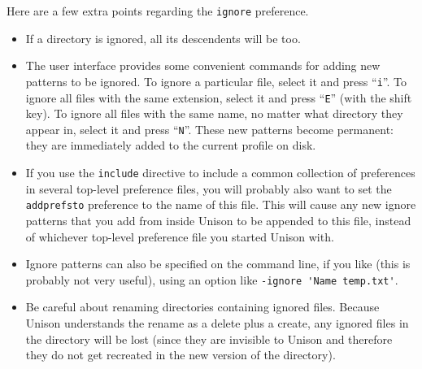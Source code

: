 \documentclass{article}
\begin{document}
Here are a few extra points regarding the \texttt{ignore} preference.
\begin{itemize}
\item If a directory is ignored, all its descendents will be too.
  
\item The user interface provides some convenient commands for adding
  new patterns to be ignored.  To ignore a particular file, select it
  and press ``{\tt i}''.  To ignore all files with the same extension,
  select it and press ``{\tt E}'' (with the shift key).  To ignore all
  files with the same name, no matter what directory they appear in,
  select it and press ``{\tt N}''.
%
These new patterns become permanent: they
are immediately added to the current profile on disk.

\item If you use the \verb|include| directive to include a common
collection of preferences in several top-level preference files, you will
probably also want to set the \verb|addprefsto| preference to the name of
this file.  This will cause any new ignore patterns that you add from
inside Unison to be appended to this file, instead of whichever top-level
preference file you started Unison with.  

\item Ignore patterns can also be specified on the command line, if
you like (this is probably not very useful), using an option like
\verb|-ignore 'Name temp.txt'|.

\item Be careful about renaming directories containing ignored files.
Because Unison understands the rename as a delete plus a create, any ignored
files in the directory will be lost (since they are invisible to Unison and
therefore they do not get recreated in the new version of the directory).


\end{itemize}
\end{document}
